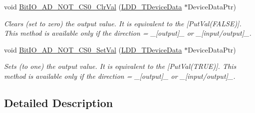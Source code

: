 \begin{DoxyCompactItemize}
void \hyperlink{group___bit_i_o___a_d___n_o_t___c_s0__module_gafbc0ab82d9d680e72cee89141cb9acc6}{Bit\-I\-O\-\_\-\-A\-D\-\_\-\-N\-O\-T\-\_\-\-C\-S0\-\_\-\-Clr\-Val} (\hyperlink{group___p_e___types__module_gac5cf1362f1f0e3a2ce71b1bf2276d091}{L\-D\-D\-\_\-\-T\-Device\-Data} $\ast$Device\-Data\-Ptr)
\begin{DoxyCompactList}\small\item\em Clears (set to zero) the output value. It is equivalent to the \mbox{[}Put\-Val(\-F\-A\-L\-S\-E)\mbox{]}. This method is available only if the direction = \-\_\-\mbox{[}output\mbox{]}\-\_\- or \-\_\-\mbox{[}input/output\mbox{]}\-\_\-. \end{DoxyCompactList}\item 
void \hyperlink{group___bit_i_o___a_d___n_o_t___c_s0__module_ga05305111ba43d0bacaa14a569bc2a75f}{Bit\-I\-O\-\_\-\-A\-D\-\_\-\-N\-O\-T\-\_\-\-C\-S0\-\_\-\-Set\-Val} (\hyperlink{group___p_e___types__module_gac5cf1362f1f0e3a2ce71b1bf2276d091}{L\-D\-D\-\_\-\-T\-Device\-Data} $\ast$Device\-Data\-Ptr)
\begin{DoxyCompactList}\small\item\em Sets (to one) the output value. It is equivalent to the \mbox{[}Put\-Val(\-T\-R\-U\-E)\mbox{]}. This method is available only if the direction = \-\_\-\mbox{[}output\mbox{]}\-\_\- or \-\_\-\mbox{[}input/output\mbox{]}\-\_\-. \end{DoxyCompactList}\end{DoxyCompactItemize}


\subsection{Detailed Description}


